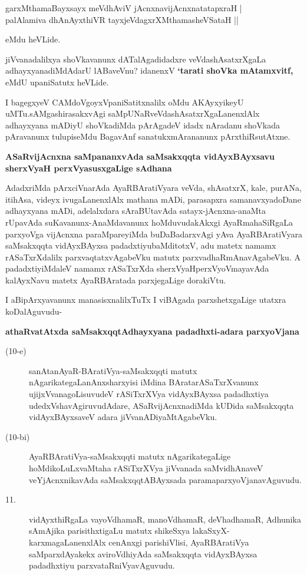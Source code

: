 \smallskip
\begin{shloka}
garxMthamaBayxsayx meVdhAviV jAcnxnavijAcnxnatatapxraH |\\\label{42c}
palAlamiva dhAnAyxthiVR tayxjeVdagxrXMthamasheVSataH || 
\end{shloka}
eMdu heVLide.
\smallskip

jiVvanadalilxya shoVkavanunx dATalAgadidadxre veVdashAsatxrXgaLa adhayxyanadiMdA\-darU lABaveVnu? \-idanenxV {\bf `tarati shoVka mAtamxvitf,\label{42d}} eMdU upaniSatutx heVLide.

I bagegxyeV CAMdoVgoyxVpaniSatitxnalilx oMdu AKAyxyikeyU uMTu.\break sAMgashirasakxvAgi saM\-pUNaR\-veVdashAsatxrXgaLanenxlAlx adhayxyana mADiyU shoVka\-diMda pArAgadeV idadx nAradanu shoVkada pAravanunx tulupiseMdu BagavAnf sanatukxmArananunx pArxthiRsutAtxne.

{\bigskip
\noindent
{\large\bf ASaRvijAcnxna saMpananxvAda saMsakxqqta vidAyxBAyxsavu sherxVyaH perxVyasusxgaLige sAdhana}}\label{page42b}
\medskip

\noindent
AdadxriMda pArxciVnarAda AyaRBAratiVyara veVda, shAsatxrX, kale, purANa, itihAsa, videyx ivugaLa\-nenxlAlx mathana mADi, parasapxra samanavxyadoDane adhayxyana mADi, adelalxdara sAraBUtavAda satayx-jAcnxna\--anaMta rUpavAda suKavanunx-AnaMda\break\-vanunx hoMduvudakAkxgi AyaRmahaSiRgaLa parxyoVga vijAcnxna paraMpareyiMda buDaBadarxvAgi yAva AyaRBAratiVyara saMsakxqqta vidAyxBAyxsa \-padadxtiyu\break \hbox{baMditotxV}, adu matetx namamx rASaTxrXdalilx parxvaqtatxvAgabeVku matutx parxvadhaRmAna\-vAgabeVku. A padadxtiyiMdaleV namamx rASaTxrXda sherxVyaHperxVyoVmayavAda kalAyxNavu matetx AyaRBAratada parxjegaLige dorakiVtu.

I aBipArxyavanunx manasisxnalilxTuTx I viBAgada parxshetxgaLige utatxra koDalAgu\-vudu-

{\bigskip
\noindent
{\large\bf athaRvatAtxda saMsakxqqtAdhayxyana padadhxti-adara parxyoVjana}}\label{page4}

\begin{description}
\item[(10-e)] sanAtanAyaR-BAratiVya-saMsakxqqti matutx nAgarikategaLanAnxsharxyisi iMdina BArata\-rASaTxrX\-vanunx ujijxVvanagoLisuvudeV rASiTxrXVya vidAyxBAyxsa padadhxtiya udedxVshavAgiruvudAdare, ASaR\-vijAcnxna\-diMda kUDida saMsakxqqta vidAyxBAyxsaveV adara jiVvanADiyaMtAgabeVku.

\item[(10-bi)] AyaRBAratiVya-saMsakxqqti matutx nAgarikategaLige hoMdikoLuLx\-vaMtaha rASiTxrXVya jiVvanada saMvi\-dhAnaveV veYjAcnxnikavAda saMsakxqqtABAyxsada parama\-parxyoVjanavAguvudu. 

\item[11.] vidAyxthiRgaLa vayoVdhamaR, manoVdhamaR, deVhadhamaR, Adhunika sAmAjika parisithxtigaLu matutx shikeSxya lakaSxyX-karxmagaLanenxlAlx cenAnxgi parishiVlisi, AyaRBAratiVya saMparxdAyakekx avi\-roV\-dhi\-yAda saMsakxqqta vidAyxBAyxsa padadhxtiyu parxvataRniVyavAguvudu.
\end{description}

